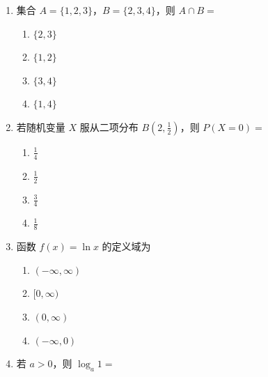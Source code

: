 \documentclass[UTF8,a4paper]{ctexart}
\begin{document}
\begin{enumerate}[leftmargin=2em,itemsep=0.8em]
\item 集合 $A=\{1,2,3\}$，$B=\{2,3,4\}$，则 $A\cap B=$

\begin{enumerate}[label=\Alph*.,itemsep=0.2em,parsep=0pt]

\item $\{2,3\}$

\item $\{1,2\}$

\item $\{3,4\}$

\item $\{1,4\}$

\end{enumerate}




\item 若随机变量 $X$ 服从二项分布 $B(2,\frac12)$，则 $P(X=0)=$

\begin{enumerate}[label=\Alph*.,itemsep=0.2em,parsep=0pt]

\item $\frac14$

\item $\frac12$

\item $\frac34$

\item $\frac18$

\end{enumerate}




\item 函数 $f(x)=\ln x$ 的定义域为

\begin{enumerate}[label=\Alph*.,itemsep=0.2em,parsep=0pt]

\item $(-\infty,\infty)$

\item $[0,\infty)$

\item $(0,\infty)$

\item $(-\infty,0)$

\end{enumerate}




\item 若 $a>0$，则 $\log_a 1=$

\begin{enumerate}[label=\Alph*.,itemsep=0.2em,parsep=0pt]


\end{enumerate}
\end{enumerate}
\end{document}
